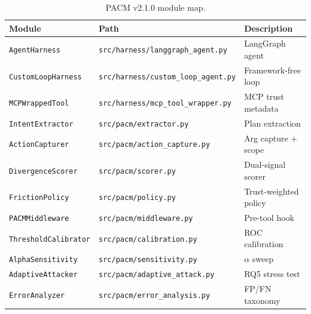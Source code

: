 \documentclass[11pt,letterpaper]{article}
\newcommand{\pacm}{\textsc{PACM}}
\newcommand{\mcp}{\textsc{MCP}}
\begin{document}
\begin{table}[htbp]
\centering
\caption{\pacm{} v2.1.0 module map.}
\label{tab:files}
\begin{tabular}{llp{6.5cm}}
\toprule
Module & Path & Description \\
\midrule
\texttt{AgentHarness}      & \texttt{src/harness/langgraph\_agent.py}  & LangGraph agent \\
\texttt{CustomLoopHarness} & \texttt{src/harness/custom\_loop\_agent.py}   & Framework-free loop \\
\texttt{MCPWrappedTool}    & \texttt{src/harness/mcp\_tool\_wrapper.py} & \mcp{} trust metadata \\
\texttt{IntentExtractor}   & \texttt{src/pacm/extractor.py}            & Plan extraction \\
\texttt{ActionCapturer}    & \texttt{src/pacm/action\_capture.py}      & Arg capture + scope \\
\texttt{DivergenceScorer}  & \texttt{src/pacm/scorer.py}               & Dual-signal scorer \\
\texttt{FrictionPolicy}    & \texttt{src/pacm/policy.py}               & Trust-weighted policy \\
\texttt{PACMMiddleware}    & \texttt{src/pacm/middleware.py}           & Pre-tool hook \\
\texttt{ThresholdCalibrator} & \texttt{src/pacm/calibration.py}        & ROC calibration \\
\texttt{AlphaSensitivity}  & \texttt{src/pacm/sensitivity.py}          & $\alpha$ sweep \\
\texttt{AdaptiveAttacker}  & \texttt{src/pacm/adaptive\_attack.py}     & RQ5 stress test \\
\texttt{ErrorAnalyzer}     & \texttt{src/pacm/error\_analysis.py}      & FP/FN taxonomy \\
\bottomrule
\end{tabular}
\end{table}
\end{document}
